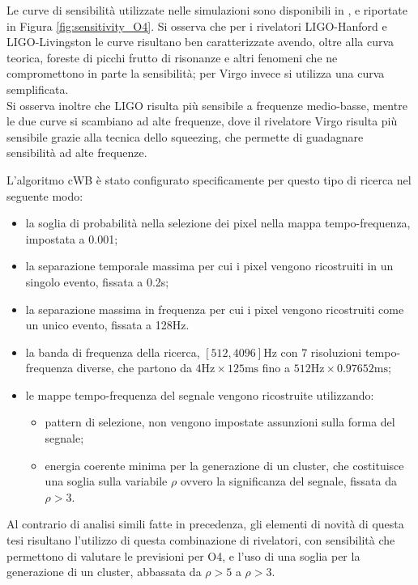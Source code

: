 Le curve di sensibilità utilizzate nelle simulazioni sono disponibili in \cite{curve_sens}, e riportate in Figura \ref{fig:sensitivity_O4}. Si osserva che per i rivelatori LIGO-Hanford e LIGO-Livingston le curve risultano ben caratterizzate avendo, oltre alla curva teorica, foreste di picchi frutto di risonanze e altri fenomeni che ne compromettono in parte la sensibilità; per Virgo invece si utilizza una curva semplificata.\\
Si osserva inoltre che LIGO risulta più sensibile a frequenze medio-basse, mentre le due curve si scambiano ad alte frequenze, dove il rivelatore Virgo risulta più sensibile grazie alla tecnica dello squeezing, che permette di guadagnare sensibilità ad alte frequenze.

L'algoritmo cWB è stato configurato specificamente per questo tipo di ricerca nel seguente modo:
\begin{itemize}
	\item la soglia di probabilità nella selezione dei pixel nella mappa tempo-frequenza, impostata a 0.001;
	\item la separazione temporale massima per cui i pixel vengono ricostruiti in un singolo evento, fissata a 0.2s;
	\item la separazione massima in frequenza per cui i pixel vengono ricostruiti come un unico evento, fissata a 128Hz.
	\item la banda di frequenza della ricerca, $[512, 4096]$Hz con 7 risoluzioni tempo-frequenza diverse, che partono da $4\text{Hz}\times 125\text{ms}$ fino a $512\text{Hz}\times 0.97652\text{ms}$;
	\item le mappe tempo-frequenza del segnale vengono ricostruite utilizzando:
	\begin{itemize}
		\item pattern di selezione, non vengono impostate assunzioni sulla forma del segnale;
		\item energia coerente minima per la generazione di un cluster, che costituisce una soglia sulla variabile $\rho$ ovvero la significanza del segnale, fissata da $\rho>3$.
	\end{itemize}
\end{itemize}
Al contrario di analisi simili fatte in precedenza, gli elementi di novità di questa tesi risultano l'utilizzo di questa combinazione di rivelatori, con sensibilità che permettono di valutare le previsioni per O4, e l'uso di una soglia per la generazione di un cluster, abbassata da $\rho>5$ a $\rho>3$.

